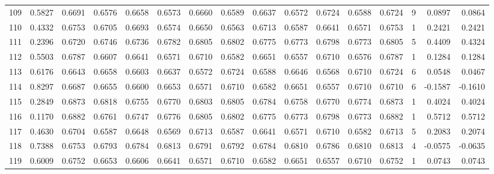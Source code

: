 \begin{tabular}{lrrrrrrrrrrrrrrr}
109 &      0.5827 &  0.6691 &  0.6576 &  0.6658 &  0.6573 &  0.6660 &  0.6589 &  0.6637 &  0.6572 &  0.6724 &   0.6588 &     0.6724 &      9 &                    0.0897 &                     0.0864 \\
110 &      0.4332 &  0.6753 &  0.6705 &  0.6693 &  0.6574 &  0.6650 &  0.6563 &  0.6713 &  0.6587 &  0.6641 &   0.6571 &     0.6753 &      1 &                    0.2421 &                     0.2421 \\
111 &      0.2396 &  0.6720 &  0.6746 &  0.6736 &  0.6782 &  0.6805 &  0.6802 &  0.6775 &  0.6773 &  0.6798 &   0.6773 &     0.6805 &      5 &                    0.4409 &                     0.4324 \\
112 &      0.5503 &  0.6787 &  0.6607 &  0.6641 &  0.6571 &  0.6710 &  0.6582 &  0.6651 &  0.6557 &  0.6710 &   0.6576 &     0.6787 &      1 &                    0.1284 &                     0.1284 \\
113 &      0.6176 &  0.6643 &  0.6658 &  0.6603 &  0.6637 &  0.6572 &  0.6724 &  0.6588 &  0.6646 &  0.6568 &   0.6710 &     0.6724 &      6 &                    0.0548 &                     0.0467 \\
114 &      0.8297 &  0.6687 &  0.6655 &  0.6600 &  0.6653 &  0.6571 &  0.6710 &  0.6582 &  0.6651 &  0.6557 &   0.6710 &     0.6710 &      6 &                   -0.1587 &                    -0.1610 \\
115 &      0.2849 &  0.6873 &  0.6818 &  0.6755 &  0.6770 &  0.6803 &  0.6805 &  0.6784 &  0.6758 &  0.6770 &   0.6774 &     0.6873 &      1 &                    0.4024 &                     0.4024 \\
116 &      0.1170 &  0.6882 &  0.6761 &  0.6747 &  0.6776 &  0.6805 &  0.6802 &  0.6775 &  0.6773 &  0.6798 &   0.6773 &     0.6882 &      1 &                    0.5712 &                     0.5712 \\
117 &      0.4630 &  0.6704 &  0.6587 &  0.6648 &  0.6569 &  0.6713 &  0.6587 &  0.6641 &  0.6571 &  0.6710 &   0.6582 &     0.6713 &      5 &                    0.2083 &                     0.2074 \\
118 &      0.7388 &  0.6753 &  0.6793 &  0.6784 &  0.6813 &  0.6791 &  0.6792 &  0.6784 &  0.6810 &  0.6786 &   0.6810 &     0.6813 &      4 &                   -0.0575 &                    -0.0635 \\
119 &      0.6009 &  0.6752 &  0.6653 &  0.6606 &  0.6641 &  0.6571 &  0.6710 &  0.6582 &  0.6651 &  0.6557 &   0.6710 &     0.6752 &      1 &                    0.0743 &                     0.0743 \\

\end{tabular}

